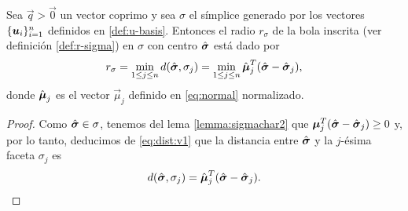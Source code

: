 \begin{theorem}
	\label{lemma:sigma-radius}
	Sea $\vec{q} > \vec{0}$ un vector coprimo y sea $\sigma$ el símplice generado por los vectores
	$\lbrace \boldsymbol{u}_i \rbrace_{i=1}^{n}$ definidos en \eqref{def:u-basis}. Entonces el radio $r_\sigma$ de
	la bola inscrita (ver definición \ref{def:r-sigma}) en $\sigma$ con centro
	$\hat{\boldsymbol{ \sigma }}$ está dado por
	\begin{equation*}
		r_\sigma = \min_{1 \leq j \leq n} d(\hat{\boldsymbol{ \sigma }}, \sigma_j)
		= \min_{1 \leq j \leq n} \hat{\boldsymbol{\mu}}_j^T(\hat{\boldsymbol{ \sigma }} - \hat{\boldsymbol{ \sigma }}_j),
	\end{equation*}
	donde $\hat{\boldsymbol{\mu}}_j$ es el vector $\vec{\mu}_j$ definido en \eqref{eq:normal} normalizado.
\end{theorem}
\begin{proof}
	Como $\hat{\boldsymbol{ \sigma }} \in \sigma$, tenemos del lema \ref{lemma:sigmachar2} que
	$\boldsymbol{\mu}_j^T(\hat{\boldsymbol{ \sigma }} - \hat{\boldsymbol{ \sigma }}_j) \geq 0$ y, por lo tanto, deducimos de \eqref{eq:dist:v1}
	que la distancia entre $\hat{\boldsymbol{ \sigma }}$ y la $j$-ésima faceta $\sigma_j$ es
	\begin{equation}
		\label{eq:dist}
		d(\hat{\boldsymbol{ \sigma }}, \sigma_j) = \hat{\boldsymbol{\mu}}_j^T(\hat{\boldsymbol{ \sigma }} - \hat{\boldsymbol{ \sigma }}_j).
	\end{equation}


\end{proof}
